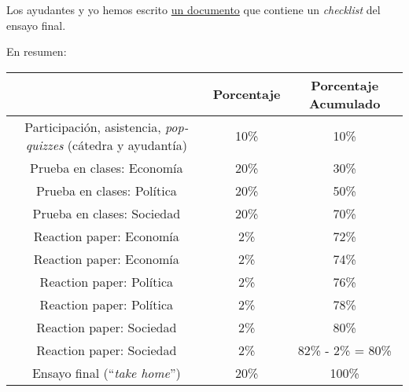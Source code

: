 \documentclass[letterpaper]{article}
\renewenvironment{itemize}{
  \begin{list}{}{
    \setlength{\leftmargin}{1.5em}
  }
}{
  \end{list}
}
\begin{document}
\begin{enumerate}
	\begin{itemize}
		\item[\Pointinghand] Los ayudantes y yo hemos escrito \href{https://github.com/hbahamonde/Intro_Ciencias_Sociales/raw/master/Ensayo_Final/Bahamonde_Ensayo_Checklist.pdf}{un documento} que contiene un \emph{checklist} del ensayo final.
	\end{itemize}

\end{enumerate}


\newpage
	En resumen:\\

	\begin{table}[h]
\begin{tabular}{ccc}
							& \textbf{Porcentaje} & {\bf Porcentaje Acumulado} \\
							\hline
Participaci\'on, asistencia, \emph{pop-quizzes} (c\'atedra y ayudant\'ia) & 10\%       & 10\%                 \\
\hline
Prueba en clases: Econom\'ia                                            & 20\%                & 30\%                 \\
Prueba en clases: Pol\'itica                                            & 20\%                & 50\%                 \\
Prueba en clases: Sociedad                                            & 20\%                & 70\%                 \\
\hline
Reaction paper: Econom\'ia                                              & 2\%                 & 72\%                 \\
Reaction paper: Econom\'ia                                              & 2\%                 & 74\%                 \\
Reaction paper: Pol\'itica                                              & 2\%                 & 76\%                 \\
Reaction paper: Pol\'itica                                              & 2\%                 & 78\%                 \\
Reaction paper: Sociedad                                              & 2\%                 & 80\%                 \\
Reaction paper: Sociedad                                              & 2\%                 & 82\% - 2\% = 80\%    \\
\hline
Ensayo final (``\emph{take home}'')                                            & 20\%                & 100\% \\
\hline             
\end{tabular}
\end{table}
\end{document}
